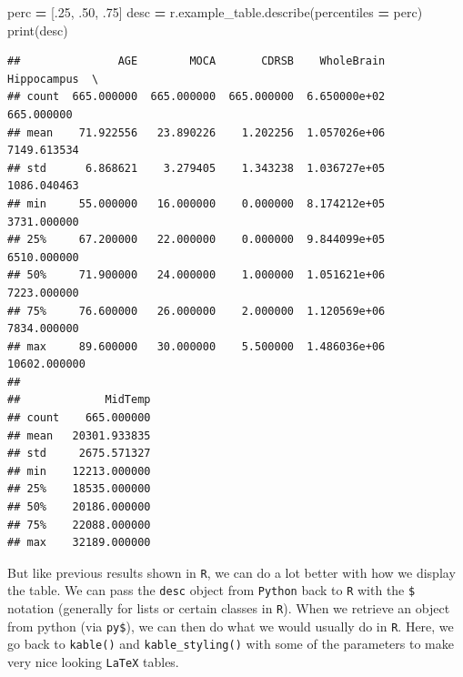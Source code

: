 \documentclass[]{article}
\newenvironment{Shaded}{\begin{snugshade}}{\end{snugshade}}
\newcommand{\BuiltInTok}[1]{#1}
\newcommand{\DataTypeTok}[1]{\textcolor[rgb]{0.13,0.29,0.53}{#1}}
\newcommand{\DecValTok}[1]{\textcolor[rgb]{0.00,0.00,0.81}{#1}}
\newcommand{\FloatTok}[1]{\textcolor[rgb]{0.00,0.00,0.81}{#1}}
\newcommand{\KeywordTok}[1]{\textcolor[rgb]{0.13,0.29,0.53}{\textbf{#1}}}
\newcommand{\NormalTok}[1]{#1}
\newcommand{\OperatorTok}[1]{\textcolor[rgb]{0.81,0.36,0.00}{\textbf{#1}}}
\newcommand{\StringTok}[1]{\textcolor[rgb]{0.31,0.60,0.02}{#1}}
\begin{document}
\begin{Shaded}
\begin{Highlighting}[]
\NormalTok{perc }\OperatorTok{=}\NormalTok{ [.}\DecValTok{25}\NormalTok{, }\FloatTok{.50}\NormalTok{, }\FloatTok{.75}\NormalTok{] }
\NormalTok{desc }\OperatorTok{=}\NormalTok{ r.example_table.describe(percentiles }\OperatorTok{=}\NormalTok{ perc)}
\BuiltInTok{print}\NormalTok{(desc)}
\end{Highlighting}
\end{Shaded}

\begin{verbatim}
##               AGE        MOCA       CDRSB    WholeBrain   Hippocampus  \
## count  665.000000  665.000000  665.000000  6.650000e+02    665.000000   
## mean    71.922556   23.890226    1.202256  1.057026e+06   7149.613534   
## std      6.868621    3.279405    1.343238  1.036727e+05   1086.040463   
## min     55.000000   16.000000    0.000000  8.174212e+05   3731.000000   
## 25%     67.200000   22.000000    0.000000  9.844099e+05   6510.000000   
## 50%     71.900000   24.000000    1.000000  1.051621e+06   7223.000000   
## 75%     76.600000   26.000000    2.000000  1.120569e+06   7834.000000   
## max     89.600000   30.000000    5.500000  1.486036e+06  10602.000000   
## 
##             MidTemp  
## count    665.000000  
## mean   20301.933835  
## std     2675.571327  
## min    12213.000000  
## 25%    18535.000000  
## 50%    20186.000000  
## 75%    22088.000000  
## max    32189.000000
\end{verbatim}

But like previous results shown in \texttt{R}, we can do a lot better
with how we display the table. We can pass the \texttt{desc} object from
\texttt{Python} back to \texttt{R} with the \texttt{\$} notation
(generally for lists or certain classes in \texttt{R}). When we retrieve
an object from python (via \texttt{py\$}), we can then do what we would
usually do in \texttt{R}. Here, we go back to \texttt{kable()} and
\texttt{kable\_styling()} with some of the parameters to make very nice
looking \texttt{LaTeX} tables.

\begin{Shaded}
\end{Shaded}
\end{document}
